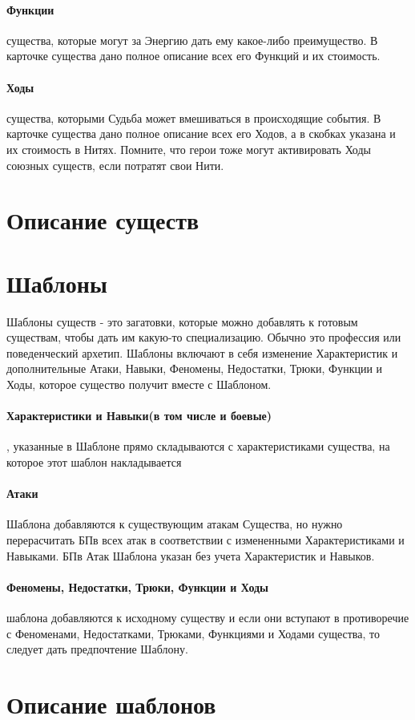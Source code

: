 \paragraph{Функции} существа, которые могут за Энергию дать ему какое-либо преимущество. В карточке существа дано полное описание всех его Функций и их стоимость.
\paragraph{Ходы} существа, которыми Судьба может вмешиваться в происходящие события. В карточке существа дано полное описание всех его Ходов, а в скобках указана и их стоимость в Нитях. Помните, что герои тоже могут активировать Ходы союзных существ, если потратят свои Нити.

\section{Описание существ}

\section{Шаблоны}
Шаблоны существ - это загатовки, которые можно добавлять к готовым существам, чтобы дать им какую-то специализацию. Обычно это профессия или поведенческий архетип.
\newline Шаблоны включают в себя изменение Характеристик и дополнительные Атаки, Навыки, Феномены, Недостатки, Трюки, Функции и Ходы, которое существо получит вместе с Шаблоном.
\paragraph{Характеристики и Навыки(в том числе и боевые)}, указанные в Шаблоне прямо складываются с характеристиками существа, на которое этот шаблон накладывается
\paragraph{Атаки} Шаблона добавляются к существующим атакам Существа, но нужно перерасчитать БПв всех атак в соответствии с измененными Характеристиками и Навыками. БПв Атак Шаблона указан без учета Характеристик и Навыков.
\paragraph{Феномены, Недостатки, Трюки, Функции и Ходы} шаблона добавляются к исходному существу и если они вступают в противоречие с Феноменами, Недостатками, Трюками, Функциями и Ходами существа, то следует дать предпочтение Шаблону.

\section{Описание шаблонов}
